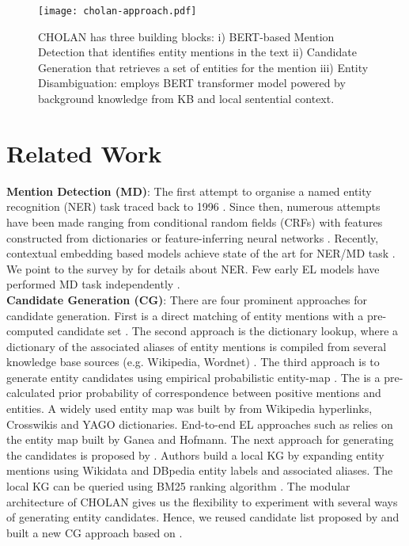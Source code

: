 \documentclass[11pt,a4paper]{article}
\begin{document}
\begin{figure*}
	\centering
	\texttt{[image: cholan-approach.pdf]}
	\caption{CHOLAN has three building blocks: i) BERT-based Mention Detection that identifies entity mentions in the text ii) Candidate Generation that retrieves a set of entities for the mention  iii) Entity Disambiguation: employs BERT transformer model powered by background knowledge from KB and local sentential context.}
	\label{fig:cholan-approach}
	    \vspace{-2mm}
	\end{figure*}
\section{Related Work} \label{sec:related}
\textbf{Mention Detection (MD)}: The first attempt to organise a named entity recognition (NER) task traced back to 1996 \cite{grishman1996message}. Since then, numerous attempts have been made ranging from conditional random fields (CRFs) with features constructed from dictionaries \cite{rocktaschel2013wbi} or feature-inferring neural networks \cite{collobert2008unified}. Recently, contextual embedding based models achieve state of the art for NER/MD task \cite{akbik-etal-2018-contextual,devlin2019bert}. We point to the survey by \citet{yadav2018survey} for details about NER. Few early EL models have performed MD task independently \cite{ceccarelli2013dexter,cornolti2016piggyback}. \\
\textbf{Candidate Generation (CG)}: There are four prominent approaches for candidate generation. First is a direct matching of entity mentions with a pre-computed candidate set \cite{zwicklbauer2016robust}. The second approach is the dictionary lookup, where a dictionary of the associated aliases of entity mentions is compiled from several knowledge base sources (e.g. Wikipedia, Wordnet) \cite{sevgili2020neural,fang2019joint,cao2017bridge}. The third approach is to generate entity candidates using empirical probabilistic entity-map . The  is a pre-calculated prior probability of correspondence between positive mentions and entities. A widely used entity map was built by \cite{ganea2017deep} from Wikipedia hyperlinks, Crosswikis \cite{spitkovsky2012cross} and YAGO \cite{DBLP:conf/emnlp/HoffartYBFPSTTW11} dictionaries. End-to-end EL approaches such as \cite{kolitsas2018end,cao2018neural} relies on the entity map built by Ganea and Hofmann. The next approach for generating the candidates is proposed by \cite{DBLP:conf/naacl/SakorMSSV0A19}. Authors build a local KG by expanding entity mentions using Wikidata and DBpedia entity labels and associated aliases. The local KG can be queried using BM25 ranking algorithm \cite{logeswaran2019zero}. The modular architecture of CHOLAN gives us the flexibility to experiment with several ways of generating entity candidates. Hence, we reused candidate list proposed by \cite{ganea2017deep} and built a new CG approach based on \cite{DBLP:conf/naacl/SakorMSSV0A19}.\\
\end{document}
